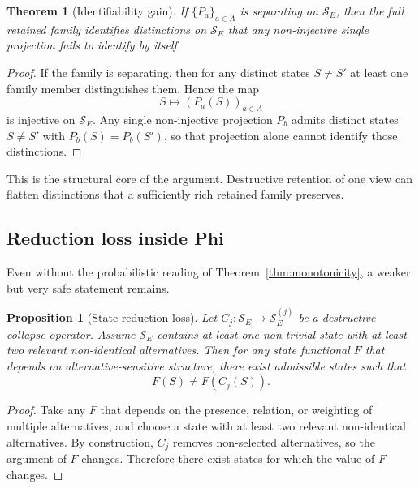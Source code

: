 \documentclass[11pt,a4paper]{article}
\newtheorem{theorem}{Theorem}
\newtheorem{proposition}{Proposition}
\begin{document}
\begin{theorem}[Identifiability gain]
\label{thm:ident}
If $\{P_a\}_{a \in A}$ is separating on $\mathcal{S}_E$, then the full retained family identifies distinctions on $\mathcal{S}_E$ that any non-injective single projection fails to identify by itself.
\end{theorem}

\begin{proof}
If the family is separating, then for any distinct states $S \neq S'$ at least one family member distinguishes them. Hence the map
\begin{equation}
S \mapsto (P_a(S))_{a \in A}
\end{equation}
is injective on $\mathcal{S}_E$. Any single non-injective projection $P_b$ admits distinct states $S \neq S'$ with $P_b(S)=P_b(S')$, so that projection alone cannot identify those distinctions.
\end{proof}

This is the structural core of the argument. Destructive retention of one view can flatten distinctions that a sufficiently rich retained family preserves.

\subsection{Reduction loss inside Phi}

Even without the probabilistic reading of Theorem~\ref{thm:monotonicity}, a weaker but very safe statement remains.

\begin{proposition}[State-reduction loss]
\label{prop:reduction}
Let $C_j : \mathcal{S}_E \to \mathcal{S}_E^{(j)}$ be a destructive collapse operator. Assume $\mathcal{S}_E$ contains at least one non-trivial state with at least two relevant non-identical alternatives. Then for any state functional $F$ that depends on alternative-sensitive structure, there exist admissible states such that
\begin{equation}
F(S) \neq F(C_j(S)).
\end{equation}
\end{proposition}

\begin{proof}
Take any $F$ that depends on the presence, relation, or weighting of multiple alternatives, and choose a state with at least two relevant non-identical alternatives. By construction, $C_j$ removes non-selected alternatives, so the argument of $F$ changes. Therefore there exist states for which the value of $F$ changes.
\end{proof}
\end{document}
